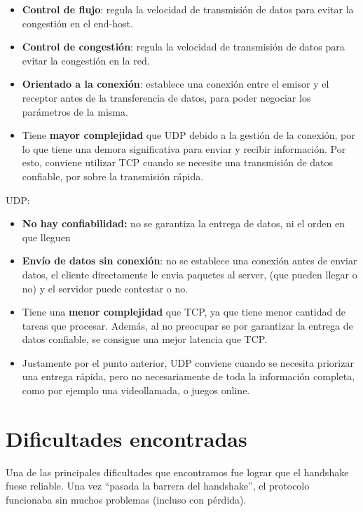 \documentclass{article}
\begin{document}
\begin{itemize}
\item
  \textbf{Control de flujo}: regula la velocidad de transmisión de datos
  para evitar la congestión en el end-host.
\item
  \textbf{Control de congestión}: regula la velocidad de transmisión de
  datos para evitar la congestión en la red.
\item
  \textbf{Orientado a la conexión}: establece una conexión entre el
  emisor y el receptor antes de la transferencia de datos, para poder
  negociar los parámetros de la misma.
\item
  Tiene \textbf{mayor complejidad} que UDP debido a la gestión de la
  conexión, por lo que tiene una demora significativa para enviar y
  recibir información. Por esto, conviene utilizar TCP cuando se
  necesite una transmisión de datos confiable, por sobre la transmisión
  rápida.
\end{itemize}

UDP:

\begin{itemize}
\item
  \textbf{No hay confiabilidad:} no se garantiza la entrega de datos, ni
  el orden en que lleguen
\item
  \textbf{Envío de datos sin conexión}: no se establece una conexión
  antes de enviar datos, el cliente directamente le envia paquetes al
  server, (que pueden llegar o no) y el servidor puede contestar o no.
\item
  Tiene una \textbf{menor complejidad} que TCP, ya que tiene menor
  cantidad de tareas que procesar. Además, al no preocupar se por
  garantizar la entrega de datos confiable, se consigue una mejor
  latencia que TCP.
\item
  Justamente por el punto anterior, UDP conviene cuando se necesita
  priorizar una entrega rápida, pero no necesariamente de toda la
  información completa, como por ejemplo una videollamada, o juegos
  online.
\end{itemize}

\section{\texorpdfstring{\textbf{Dificultades
encontradas}}{Dificultades encontradas}}\label{dificultades-encontradas}

Una de las principales dificultades que encontramos fue lograr que el
handshake fuese reliable. Una vez ``pasada la barrera del handshake'',
el protocolo funcionaba sin muchos problemas (incluso con pérdida).
\end{document}
